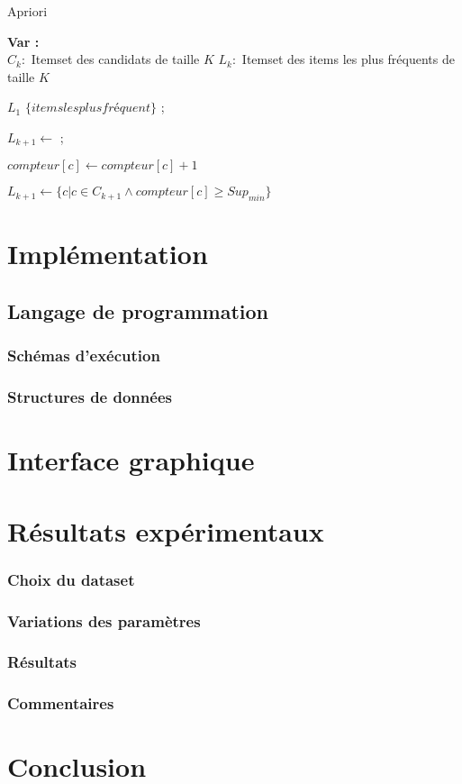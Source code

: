 	
		\begin{algorithm}[H]
			\caption{Apriori}
			
			\textbf{Var :} \\
			$C_k : $ Itemset des candidats de taille $K$
			$L_k : $ Itemset des items les plus fréquents de taille $K$
			
			
			\Begin
			{
				$L_1$ \gets $\lbrace items les plus fréquent \rbrace$ ;\\
				{
					$L_{k+1} \gets $ ;\\
					{
						{
							{
								$compteur[c] \gets compteur[c]+1$
							}
						}
						
					}
					$L_{k+1} \gets \lbrace 	c | c \in C_{k+1} \land compteur[c] \geq Sup_{min}\rbrace$ 	
				}
				
			}
		\end{algorithm}
	\section{Implémentation}
		\subsection{Langage de programmation}
		\subsubsection{Schémas d'exécution}
		\subsubsection{Structures de données}
	\section{Interface graphique}
	
	\section{Résultats expérimentaux}
		\subsubsection{Choix du dataset}
		\subsubsection{Variations des paramètres}
		\subsubsection{Résultats}
		\subsubsection{Commentaires}
		
	\section{Conclusion}
	